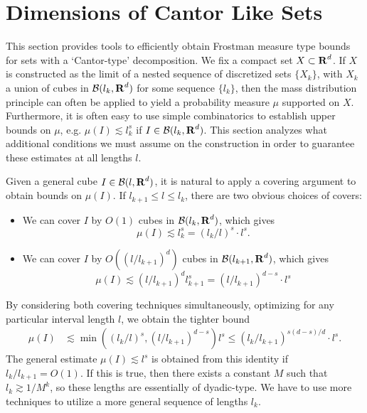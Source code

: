 \section{Dimensions of Cantor Like Sets}

This section provides tools to efficiently obtain Frostman measure type bounds for sets with a `Cantor-type' decomposition.  We fix a compact set $X \subset \operatorname{\mathbf{R}}^d$. If $X$ is constructed as the limit of a nested sequence of discretized sets $\{ X_k \}$, with $X_k$ a union of cubes in $\operatorname{\mathcal{B}}(l_k,\operatorname{\mathbf{R}}^d)$ for some sequence $\{ l_k \}$, then the mass distribution principle can often be applied to yield a probability measure $\mu$ supported on $X$. Furthermore, it is often easy to use simple combinatorics to establish upper bounds on $\mu$, e.g. $\mu(I) \lesssim l_k^s$ if $I \in \operatorname{\mathcal{B}}(l_k,\operatorname{\mathbf{R}}^d)$. This section analyzes what additional conditions we must assume on the construction in order to guarantee these estimates at all lengths $l$.

Given a general cube $I \in \operatorname{\mathcal{B}}(l,\operatorname{\mathbf{R}}^d)$, it is natural to apply a covering argument to obtain bounds on $\mu(I)$. If $l_{k+1} \leq l \leq l_k$, there are two obvious choices of covers:
%
\begin{itemize}
	\item We can cover $I$ by $O(1)$ cubes in $\operatorname{\mathcal{B}}(l_k, \operatorname{\mathbf{R}}^d)$, which gives
	\[ \mu(I) \lesssim l_k^s = (l_k/l)^s \cdot l^s. \]

	\item We can cover $I$ by $O((l/l_{k+1})^d)$ cubes in $\operatorname{\mathcal{B}}(l_{k+1}, \operatorname{\mathbf{R}}^d)$, which gives
	\[ \mu(I) \lesssim (l/l_{k+1})^d l_{k+1}^s = (l/l_{k+1})^{d-s} \cdot l^s \]
\end{itemize}
%
By considering both covering techniques simultaneously, optimizing for any particular interval length $l$, we obtain the tighter bound
%
\begin{align*}
    \mu(I) &\lesssim \min\left( (l_k/l)^s, (l/l_{k+1})^{d - s} \right) l^s \leq (l_k/l_{k+1})^{s(d - s)/d} \cdot l^s.
\end{align*}
%
The general estimate $\mu(I) \lesssim l^s$ is obtained from this identity if $l_k/l_{k+1} = O(1)$. If this is true, then there exists a constant $M$ such that $l_k \gtrsim 1/M^k$, so these lengths are essentially of dyadic-type. We have to use more techniques to utilize a more general sequence of lengths $l_k$.

